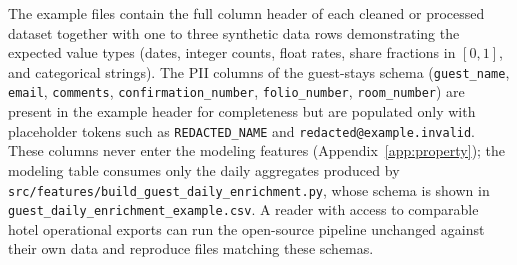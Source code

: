 \documentclass[conference]{IEEEtran}
\begin{document}
\begin{table}[h]
\centering
\caption{Public Schema Examples in \texttt{data\_examples/}}
\label{tab:examples_files}
\end{table}

The example files contain the full column header of each cleaned or processed dataset together with one to three synthetic data rows demonstrating the expected value types (dates, integer counts, float rates, share fractions in $[0,1]$, and categorical strings). The PII columns of the guest-stays schema (\texttt{guest\_name}, \texttt{email}, \texttt{comments}, \texttt{confirmation\_number}, \texttt{folio\_number}, \texttt{room\_number}) are present in the example header for completeness but are populated only with placeholder tokens such as \texttt{REDACTED\_NAME} and \texttt{redacted@example.invalid}. These columns never enter the modeling features (Appendix~\ref{app:property}); the modeling table consumes only the daily aggregates produced by \texttt{src/features/build\_guest\_daily\_enrichment.py}, whose schema is shown in \texttt{guest\_daily\_enrichment\_example.csv}. A reader with access to comparable hotel operational exports can run the open-source pipeline unchanged against their own data and reproduce files matching these schemas.



\end{document}
